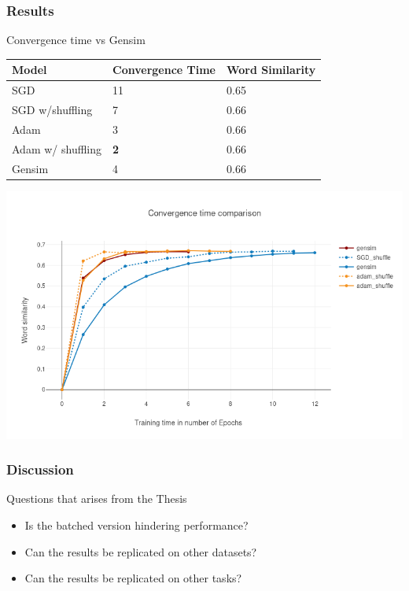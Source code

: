 \begin{frame}
\frametitle{Results}
Convergence time vs Gensim 
    \begin{table}[]
\begin{tabular}{|l|l|l|}
\hline
Model    & Convergence Time & Word Similarity \\ \hline
SGD & {11}              & 0.65            \\ \hline
SGD w/shuffling & {7}              & 0.66            \\ \hline
Adam & {3}              & 0.66            \\ \hline
Adam w/ shuffling & \textbf{2}              & 0.66      \\ \hline
Gensim   & 4          & 0.66            \\ \hline
\end{tabular}
\end{table}
\includegraphics[scale=0.25]{images/gensim_vs_adam}
  \end{frame}
  
  \begin{frame}
\frametitle{Discussion}
\begin{Large}
Questions that arises from the Thesis
\end{Large}
\begin{itemize}
\item Is the batched version hindering performance? 
\item Can the results be replicated on other datasets?
\item Can the results be replicated on other tasks? 
\end{itemize}
  \end{frame}